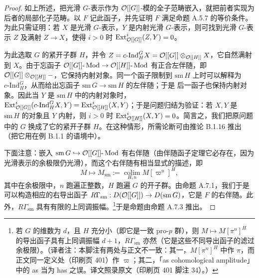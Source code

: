 \begin{proof}
如上所述，把光滑 $G$-表示作为 $\mathcal{O}[[G]]$-模的全子范畴嵌入，就把前者实现为后者的局部化子范畴。以 $F$ 记此函子，并先证明 $F$ 满足命题 A.5.7 的等价条件。为此只需证明：若 $X$ 是光滑 $G$-表示，$Y$ 是内射光滑 $G$-表示，则可找到光滑 $G$-表示 $Z$ 及满射 $Z\to X$，使得 $i>0$ 时 $\mathrm{Ext}^i_{\mathcal{O}[[G]]}(Z,Y)=0$。

为此选取 $G$ 的紧开子群 $H$，并令 $Z=c\text{-}\mathrm{Ind}_H^GX=\mathcal{O}[[G]]\otimes_{\mathcal{O}[[H]]}X$，它自然满射到 $X$。由于忘函子 $\mathcal{O}[[G]]\text{-}\operatorname{Mod}\to\mathcal{O}[[H]]\text{-}\operatorname{Mod}$ 有正合左伴随，即 $\mathcal{O}[[G]]\otimes_{\mathcal{O}[[H]]}-$，它保持内射对象。同一个函子限制到 $\mathrm{sm}\,H$ 上时可以解释为 $c\text{-}\mathrm{Ind}_H^G$，从而给出忘函子 $\mathrm{sm}\,G\to\mathrm{sm}\,H$ 的左伴随；于是
后一函子也保持内射对象。因此当 $Y$ 是 $\mathrm{sm}\,H$ 中的内射对象时，$\mathrm{Ext}^i_{\mathcal{O}[[G]]}(c\text{-}\mathrm{Ind}_H^GX,Y)=\mathrm{Ext}^i_{\mathcal{O}[[H]]}(X,Y)$；于是问题归结为验证：若 $X,Y$ 是 $\mathrm{sm}\,H$ 的对象且 $Y$ 内射，则 $i>0$ 时 $\mathrm{Ext}^i_{\mathcal{O}[[H]]}(X,Y)=0$。简言之，我们把原问题中的 $G$ 换成了它的紧开子群 $H$。在这种情形，所需论断可由推论 B.1.16 推出（把它用在例 B.1.1 的语境中）。

下面注意：嵌入 $\mathrm{sm}\,G\hookrightarrow\mathcal{O}[[G]]\text{-}\operatorname{Mod}$ 有右伴随（由伴随函子定理它必存在，因为光滑表示的余极限仍光滑），而这个右伴随有相当显式的描述，即
\[
M\mapsto M_{\mathrm{sm}}:=\operatorname*{colim}_{H,n}M[\varpi^n]^H,
\]
其中在余极限中，$n$ 跑遍正整数，$H$ 跑遍 $G$ 的开子群。由命题 A.7.1，我们于是可以构造相应的右导出函子 $R\Gamma_{\mathrm{sm}}:D(\mathcal{O}[[G]])\to D(\mathrm{sm}\,G)$，它是 $F$ 的右伴随。此外，$R\Gamma_{\mathrm{sm}}$ 具有有限的上同调振幅。\footnote{若 $G$ 的维数为 $d$，且 $H$ 充分小（即它是一致 pro-$p$ 群），则 $M\mapsto M[\pi^n]^H$ 的导出函子具有上同调振幅 $d+1$，$R\Gamma_{\mathrm{sm}}$ 亦然（它是这些不同导出函子的滤过余极限）。（译者注：本脚注有两处与正文不一致：其一，$M[\pi^n]^H$ 中作 $\pi$，而正文同一定义处（印刷页 401）作 $\varpi$；其二，「as cohomological amplitude」中的 as 当为 has 之误。译文照录原文（印刷页 401 脚注 34）。）}于是命题由命题 A.7.3 推出。
\end{proof}

